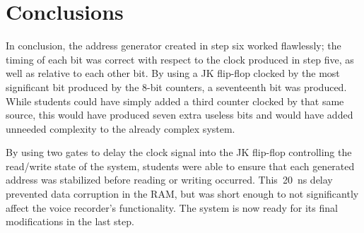 \section{Conclusions}

In conclusion, the address generator created in step six worked flawlessly; the
timing of each bit was correct with respect to the clock produced in step five,
as well as relative to each other bit.  By using a JK flip-flop clocked by
the most significant bit produced by the 8-bit counters, a seventeenth bit was
produced.  While students could have simply added a third counter clocked by
that same source, this would have produced seven extra useless bits and would
have added unneeded complexity to the already complex system.

By using two  gates to delay the clock signal into the JK flip-flop
controlling the read/write state of the system, students were able to ensure
that each generated address was stabilized before reading or writing occurred.
This~\SI{20}{\nano\second} delay prevented data corruption in the RAM, but was
short enough to not significantly affect the voice recorder's functionality.
The system is now ready for its final modifications in the last step.
